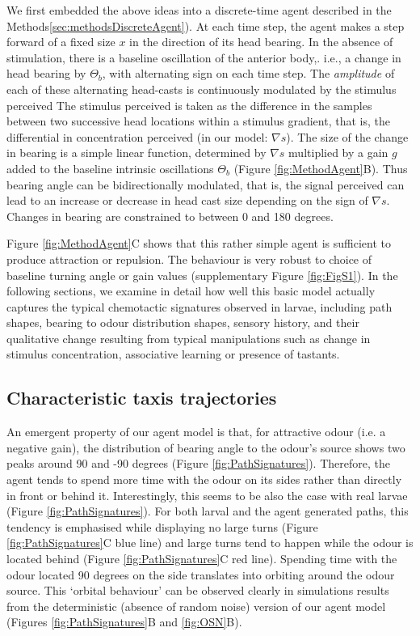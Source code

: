 \documentclass[11pt,a4paper]{article}
\newcommand{\todoKL}[1]{\todo[author=KL,color=blue!40, size=\tiny,inline]{1}}
\begin{document}
We first embedded the above ideas into a discrete-time agent described in the Methods\ref{sec:methodsDiscreteAgent}). At each time step, the agent makes a step forward of a fixed size $x$ 
\todoKL{check parameter name}
in the direction of its head bearing. 
In the absence of stimulation, there is a baseline oscillation of the anterior body,. i.e., a change in head bearing by $\Theta_b$, with alternating sign on each time step.
The {\it amplitude} of each of these alternating head-casts is  continuously modulated by the stimulus perceived
 The stimulus perceived is taken as the difference in the samples between two successive head locations within a stimulus gradient, that is, the differential in concentration perceived (in our model: $\nabla s$). The size of the change in bearing is a simple linear function, determined by $\nabla s$ multiplied by a gain  $g$ added to the baseline intrinsic oscillations $\Theta_b$ (Figure \ref{fig:MethodAgent}B). Thus bearing angle can be bidirectionally modulated, that is, the signal perceived can lead to an increase or decrease in head cast size depending on the sign of $\nabla s$.  Changes in bearing are constrained to between 0 and 180 degrees.

Figure \ref{fig:MethodAgent}C shows that this rather simple agent is sufficient to produce attraction or repulsion. The behaviour is very robust to choice of baseline turning angle or gain values (supplementary Figure \ref{fig:FigS1}). In the following sections, we examine in detail how well this basic model actually captures the typical chemotactic signatures observed in larvae, including path shapes, bearing to odour distribution shapes, sensory history, and their qualitative change resulting from typical manipulations such as change in stimulus concentration, associative learning or presence of tastants. 

\subsection{Characteristic taxis trajectories}
An emergent property of our agent model is that, for attractive odour (i.e. a negative gain), the distribution of bearing angle to the odour's source shows two peaks around 90 and -90 degrees (Figure \ref{fig:PathSignatures}). Therefore, the agent tends to spend more time with the odour on its sides rather than directly in front or behind it. Interestingly, this seems to be also the case with real larvae (Figure \ref{fig:PathSignatures}). For both  larval and the agent generated paths, this tendency is emphasised while displaying no large turns (Figure \ref{fig:PathSignatures}C blue line) and large turns tend to happen while the odour is located behind (Figure \ref{fig:PathSignatures}C red line). Spending time with the odour located 90 degrees on the side translates into orbiting around the odour source. This ‘orbital behaviour’ can be observed clearly in simulations results from the deterministic (absence of random noise) version of our agent model (Figures \ref{fig:PathSignatures}B and \ref{fig:OSN}B).
\end{document}
